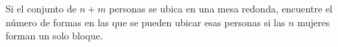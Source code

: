 Si el conjunto de \(n+m\) personas se ubica en una mesa redonda, encuentre el número de formas en las que se pueden ubicar esas personas si las \(n\) mujeres forman un solo bloque.
